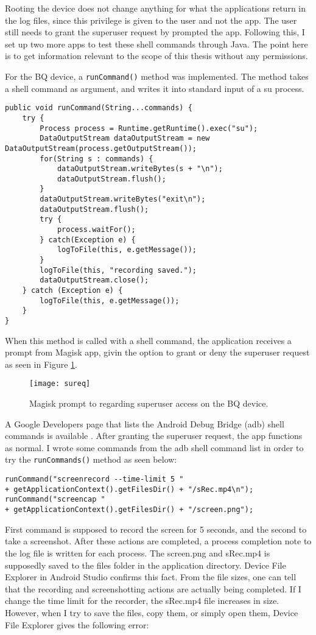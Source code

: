 \documentclass[
  a4paper,  %
  twoside,  %
  bibliography=totoc,
  headsepline,
  cleardoublepage=empty,
  parskip=half,
  draft=false,
  open=any
]{scrbook}
\begin{document}
Rooting the device does not change anything for what the applications return in the log files, since this privilege is given to the user and not the app. The user still needs to grant the superuser request by prompted the app. Following this, I set up two more apps to test these shell commands through Java. The point here is to get information relevant to the scope of this thesis without any permissions. 

For the BQ device, a \texttt{runCommand()} method was implemented. The method takes a shell command as argument, and writes it into standard input of a su process.
\begin{lstlisting}
public void runCommand(String...commands) {
	try {
		Process process = Runtime.getRuntime().exec("su");
		DataOutputStream dataOutputStream = new DataOutputStream(process.getOutputStream());
		for(String s : commands) {
			dataOutputStream.writeBytes(s + "\n");
			dataOutputStream.flush();
		}
		dataOutputStream.writeBytes("exit\n");
		dataOutputStream.flush();
		try {
			process.waitFor();
		} catch(Exception e) {
			logToFile(this, e.getMessage());
		}
		logToFile(this, "recording saved.");
		dataOutputStream.close();
	} catch (Exception e) {
		logToFile(this, e.getMessage());
	}
}
\end{lstlisting}
When this method is called with a shell command, the application receives a prompt from Magisk app, givin the option to grant or deny the superuser request as seen in Figure \ref{sureq}.
\begin{figure}\centering
	\texttt{[image: sureq]}
	\caption{Magisk prompt to regarding superuser access on the BQ device.}
	\label{sureq}
\end{figure}
A Google Developers page that lists the Android Debug Bridge (adb) shell commands is available \cite{adbshellcmd}. After granting the superuser request, the app functions as normal. I wrote some commands from the adb shell command list in order to try the \texttt{runCommands()} method as seen below:
\begin{lstlisting}
runCommand("screenrecord --time-limit 5 "
+ getApplicationContext().getFilesDir() + "/sRec.mp4\n");
runCommand("screencap "
+ getApplicationContext().getFilesDir() + "/screen.png");
\end{lstlisting}
First command is supposed to record the screen for 5 seconds, and the second to take a screenshot. After these actions are completed, a process completion note to the log file is written for each process. The screen.png and sRec.mp4 is supposedly saved to the files folder in the application directory. Device File Explorer in Android Studio confirms this fact. From the file sizes, one can tell that the recording and screenshotting actions are actually being completed. If I change the time limit for the recorder, the sRec.mp4 file increases in size. However, when I try to save the files, copy them, or simply open them, Device File Explorer gives the following error:
\end{document}
